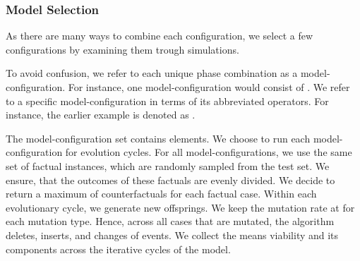 \documentclass[./../../paper.tex]{subfiles}
\begin{document}
\subsubsection{Model Selection}
\label{sec:exp1}
As there are many ways to combine each configuration, we select a few configurations by examining them trough simulations.  


 To avoid confusion, we refer to each unique phase combination as a model-configuration. For instance, one model-configuration would consist of . We refer to a specific model-configuration in terms of its abbreviated operators. For instance, the earlier example is denoted as .

The model-configuration set contains  elements. We choose to run each model-configuration for  evolution cycles. For all model-configurations, we use the same set of  factual \glspl{instance}, which are randomly sampled from the test set. We ensure, that the outcomes of these factuals are evenly divided. We decide to return a maximum of  counterfactuals for each factual case. Within each evolutionary cycle, we generate  new offsprings. We keep the mutation rate at  for each mutation type. Hence, across all cases that are mutated, the algorithm deletes, inserts, and changes  of events. We collect the means viability and its components across the iterative cycles of the model.


\end{document}
